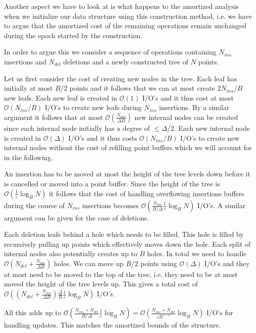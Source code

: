 \documentclass[twoside,11pt,openright]{report}
\def \epsilon {\varepsilon}
\begin{document}
Another aspect we have to look at is what happens to the amortized analysis when we initialize our data structure using this construction method, i.e. we have to argue that the amortized cost of the remaining operations remain unchanged during the epoch started by the construction.

In order to argue this we consider a sequence of operations containing $N_{ins}$ insertions and $N_{del}$ deletions and a newly constructed tree of $N$ points.

Let us first consider the cost of creating new nodes in the tree. Each leaf has initially at most $B/2$ points and it follows that we can at most create $2N_{ins}/B$ new leafs. Each new leaf is created in $\mathcal{O}(1)$ I/O's and it thus cost at most $\mathcal{O}(N_{ins}/B)$ I/O's to create new leafs during $N_{ins}$ insertions.
By a similar argument it follows that at most $\mathcal{O}(\frac{N_{ins}}{\Delta B})$ new internal nodes can be created since each internal node initially has a degree of $\leq \Delta/2$. Each new internal node is created in $\mathcal{O}(\Delta)$ I/O's and it thus costs $\mathcal{O}(N_{ins}/B)$ I/O's to create new internal nodes without the cost of refilling point buffers which we will account for in the following.

An insertion has to be moved at most the height of the tree levels down before it is cancelled or moved into a point buffer. Since the height of the tree is $\mathcal{O}(\frac{1}{\epsilon} \log_B N)$ it follows that the cost of handling overflowing insertions buffers during the course of $N_{ins}$ insertions becomes $\mathcal{O}(\frac{N_{ins}}{B/\Delta}\frac{1}{\epsilon}\log_B N)$ I/O's.
A similar argument can be given for the case of deletions.

Each deletion leafs behind a hole which needs to be filled. This hole is filled by recursively pulling up points which effectively moves down the hole. Each split of internal nodes also potentially creates up to $B$ holes.
In total we need to handle $\mathcal{O}(N_{del} + \frac{N_{ins}}{\Delta B})$ holes. We can move up $B/2$ points using $\mathcal{O}(\Delta)$ I/O's and they at most need to be moved to the top of the tree, i.e. they need to be at most moved the height of the tree levels up. This gives a total cost of $\mathcal{O}((N_{del} + \frac{N_{ins}}{\Delta B})\frac{\Delta}{B}\frac{1}{\epsilon} \log_B N)$ I/O's.

All this adds up to $\mathcal{O}(\frac{N_{ins}+N_{del}}{B/\Delta} \frac{1}{\epsilon} \log_B N) = \mathcal{O}(\frac{N_{ins}+N_{del}}{\epsilon B^{1-\epsilon}} \log_B N)$  I/O's for handling updates. This matches the amortized bounds of the structure.
\end{document}
